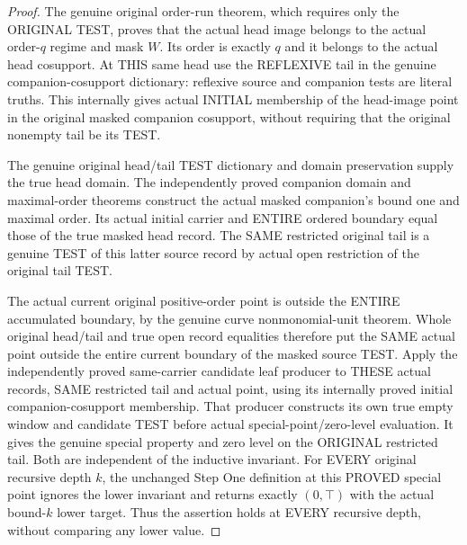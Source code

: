 \begin{proof}
The genuine original order-run theorem, which requires only the ORIGINAL
TEST, proves that the actual head image belongs to the actual order-$q$
regime and mask $W$. Its order is exactly $q$ and it belongs to the actual
head cosupport. At THIS same head use the REFLEXIVE tail in the genuine
companion-cosupport dictionary: reflexive source and companion tests are
literal truths. This internally gives actual INITIAL membership of the
head-image point in the original masked companion cosupport, without
requiring that the original nonempty tail be its TEST.

The genuine original head/tail TEST dictionary and domain preservation
supply the true head domain. The independently proved companion domain
and maximal-order theorems construct the actual masked companion's bound
one and maximal order. Its actual initial carrier and ENTIRE ordered
boundary equal those of the true masked head record. The SAME restricted
original tail is a genuine TEST of this latter source record by actual
open restriction of the original tail TEST.

The actual current original positive-order point is outside the ENTIRE
accumulated boundary, by the genuine curve nonmonomial-unit theorem.
Whole original head/tail and true open record equalities therefore put
the SAME actual point outside the entire current boundary of the masked
source TEST. Apply the independently proved same-carrier candidate leaf
producer to THESE actual records, SAME restricted tail and actual point,
using its internally proved initial companion-cosupport membership. That
producer constructs its own true empty window and candidate TEST before
actual special-point/zero-level evaluation. It gives the genuine special property and zero level on the ORIGINAL
restricted tail. Both are independent of the inductive invariant. For
EVERY original recursive depth $k$, the unchanged Step One definition at
this PROVED special point ignores the lower invariant and returns exactly
$(0,\top)$ with the actual bound-$k$ lower target. Thus the assertion holds
at EVERY recursive depth, without comparing any lower value.
\end{proof}

